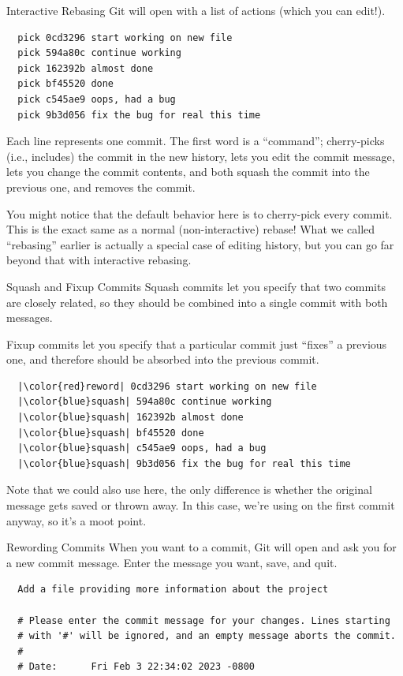 \begin{frame}[fragile]{Interactive Rebasing}
  Git will open  with a list of actions (which you can edit!).
  \begin{verbatim}
  pick 0cd3296 start working on new file
  pick 594a80c continue working
  pick 162392b almost done
  pick bf45520 done
  pick c545ae9 oops, had a bug
  pick 9b3d056 fix the bug for real this time
  \end{verbatim}
  Each line represents one commit.  The first word is a \enquote{command};
   cherry-picks (i.e., includes) the commit in the new history,
   lets you edit the commit message,  lets you change the
  commit contents,  and  both squash the commit into the
  previous one, and  removes the commit.
\end{frame}

You might notice that the default behavior here is to cherry-pick every commit.
This is the exact same as a normal (non-interactive) rebase!  What we called
\enquote{rebasing} earlier is actually a special case of editing history, but
you can go far beyond that with interactive rebasing.

\begin{frame}[fragile]{Squash and Fixup Commits}
  \vspace{-0.5em}
  Squash commits let you specify that two commits are closely related, so they
  should be combined into a single commit with both messages.

  Fixup commits let you specify that a particular commit just \enquote{fixes} a
  previous one, and therefore should be absorbed into the previous commit.
  \begin{verbatim}
  |\color{red}reword| 0cd3296 start working on new file
  |\color{blue}squash| 594a80c continue working
  |\color{blue}squash| 162392b almost done
  |\color{blue}squash| bf45520 done
  |\color{blue}squash| c545ae9 oops, had a bug
  |\color{blue}squash| 9b3d056 fix the bug for real this time
  \end{verbatim}
  \vspace{-2.5em}
\end{frame}

Note that we could also use  here, the only difference is whether
the original message gets saved or thrown away.  In this case, we're using
 on the first commit anyway, so it's a moot point.

\begin{frame}[fragile]{Rewording Commits}
  When you want to  a commit, Git will open  and ask
  you for a new commit message.  Enter the message you want, save, and quit.

  \begin{verbatim}
  Add a file providing more information about the project

  # Please enter the commit message for your changes. Lines starting
  # with '#' will be ignored, and an empty message aborts the commit.
  #
  # Date:      Fri Feb 3 22:34:02 2023 -0800
  \end{verbatim}
\end{frame}

